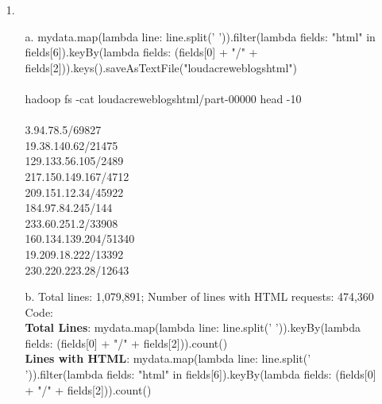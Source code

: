\documentclass{article}
\begin{document}
\begin{itemize}

\item[1.] 
	\begin{itemize}
		\item[a.] mydata.map(lambda line: line.split(' ')).filter(lambda fields: "html" in fields[6]).keyBy(lambda fields: (fields[0] + "/" + fields[2])).keys().saveAsTextFile("loudacre\textunderscore weblogs\textunderscore html")\\
			\\
			hadoop fs -cat loudacre\textunderscore weblogs\textunderscore html/part-00000 \text{\textbar} head -10\\
			\\
			3.94.78.5/69827\\
			19.38.140.62/21475\\
			129.133.56.105/2489\\
			217.150.149.167/4712\\
			209.151.12.34/45922\\
			184.97.84.245/144\\
			233.60.251.2/33908\\
			160.134.139.204/51340\\
			19.209.18.222/13392\\
			230.220.223.28/12643\\

		\item[b.] Total lines: 1,079,891; Number of lines with HTML requests: 474,360\\
		Code: \\
		\textbf{Total Lines}: mydata.map(lambda line: line.split(' ')).keyBy(lambda fields: (fields[0] + "/" + fields[2])).count()\\
		\textbf{Lines with HTML}: mydata.map(lambda line: line.split(' ')).filter(lambda fields: "html" in fields[6]).keyBy(lambda fields: (fields[0] + "/" + fields[2])).count()
	\end{itemize}


\end{itemize}
\end{document}
